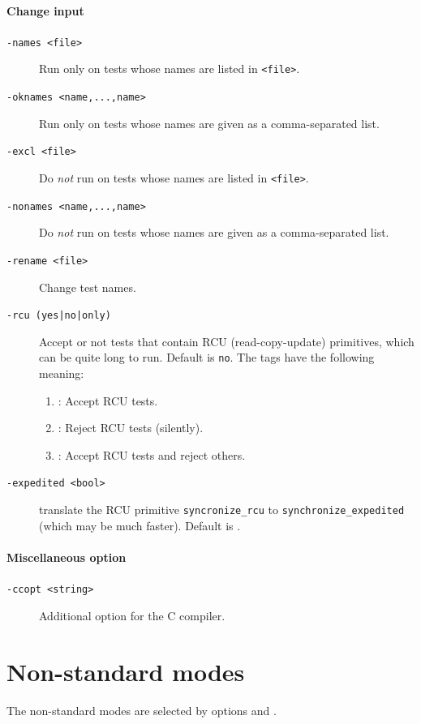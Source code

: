 \paragraph*{Change input}
\begin{description}
\item[{\tt -names <file>}] Run \klitmus{} only on tests whose names are
listed in \texttt{<file>}.
\item[{\tt -oknames <name,...,name>}] Run \klitmus{} only on tests whose
names are given as a comma-separated list.
\item[{\tt -excl <file>}] Do \emph{not} run \klitmus{} on tests whose names are
listed in \texttt{<file>}.
\item[{\tt -nonames <name,...,name>}] Do \emph{not} run \klitmus{} on tests whose names are given as a comma-separated list.
\item[{\tt -rename <file>}] Change test names.
\item[{\tt -rcu (yes|no|only)}]
Accept or not tests that contain RCU (read-copy-update) primitives,
which can be quite long to run. Default is \texttt{no}.
The tags have the following meaning:
\begin{enumerate}
\item {}: Accept RCU tests.
\item {}: Reject  RCU tests (silently).
\item {}: Accept RCU tests and reject others.
\end{enumerate}
\item[\tt -expedited <bool>]  translate the RCU primitive
\verb+syncronize_rcu+ to
\verb+synchronize_expedited+ (which may be much faster).
Default is .
\end{description}

\paragraph*{Miscellaneous option}
\begin{description}
\item[{\tt -ccopt <string>}]Additional option for the C compiler.
\end{description}

\section{\label{sec:nostd} Non-standard modes}
The non-standard modes are selected by \litmus{} options  and .


